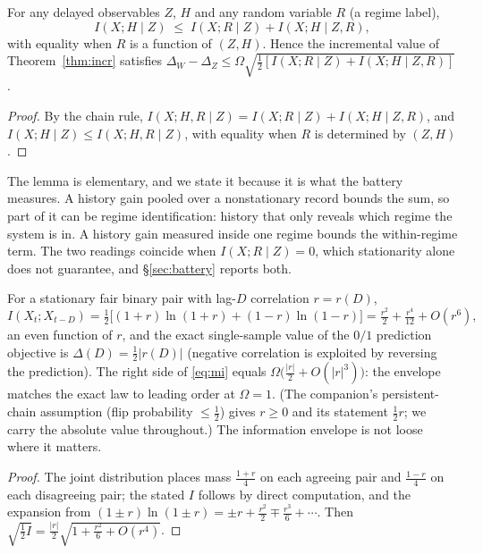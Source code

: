 \documentclass[acmsmall,screen,review,anonymous]{acmart}
\begin{document}
\begin{lemma}\label{lem:regime}
For any delayed observables $Z$, $H$ and any random variable $R$ (a regime
label),
\[
I(X;H\mid Z)\;\le\;I(X;R\mid Z)+I(X;H\mid Z,R),
\]
with equality when $R$ is a function of $(Z,H)$. Hence the incremental value
of Theorem~\ref{thm:incr} satisfies
$\Delta_W-\Delta_Z\le\Omega\sqrt{\tfrac12[I(X;R\mid Z)+I(X;H\mid Z,R)]}$.
\end{lemma}

\begin{proof}
By the chain rule, $I(X;H,R\mid Z)=I(X;R\mid Z)+I(X;H\mid Z,R)$,
and $I(X;H\mid Z)\le I(X;H,R\mid Z)$, with equality when $R$ is
determined by $(Z,H)$.
\end{proof}

The lemma is elementary, and we state it because it is what the battery
measures. A history gain pooled over a nonstationary record bounds the
sum, so part of it can be regime identification: history that only reveals
which regime the system is in. A history gain measured inside one regime
bounds the within-regime term. The two readings coincide when
$I(X;R\mid Z)=0$, which stationarity alone does not guarantee, and
\S\ref{sec:battery} reports both.

\begin{proposition}
\label{prop:tight}
For a stationary fair binary pair with lag-$D$ correlation $r=r(D)$,
\[
I(X_t;X_{t-D})=\tfrac12\bigl[(1{+}r)\ln(1{+}r)+(1{-}r)\ln(1{-}r)\bigr]
=\tfrac{r^2}{2}+\tfrac{r^4}{12}+O(r^6),
\]
an even function of $r$, and the exact single-sample value of the $0/1$
prediction objective is $\Delta(D)=\tfrac12|r(D)|$ (negative correlation is
exploited by reversing the prediction). The right side of \eqref{eq:mi}
equals $\Omega\bigl(\tfrac{|r|}2+O(|r|^3)\bigr)$: the envelope matches the
exact law to leading order at $\Omega=1$. (The companion's persistent-chain
assumption (flip probability $\le\tfrac12$) gives $r\ge 0$ and its
statement $\tfrac12 r$; we carry the absolute value throughout.) The
information envelope is not loose where it matters.
\end{proposition}

\begin{proof}
The joint distribution places mass $\tfrac{1+r}{4}$ on each agreeing pair and
$\tfrac{1-r}{4}$ on each disagreeing pair; the stated $I$ follows by direct
computation, and the expansion from
$(1\pm r)\ln(1\pm r)=\pm r+\tfrac{r^2}{2}\mp\tfrac{r^3}{6}+\cdots$. Then
$\sqrt{\tfrac12 I}=\tfrac{|r|}2\sqrt{1+\tfrac{r^2}{6}+O(r^4)}$.
\end{proof}
\end{document}

